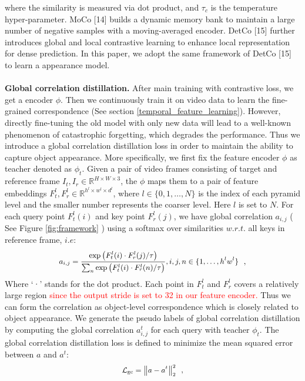\documentclass{article}
\begin{document}
	where the similarity is measured via dot product, and $\tau_c$ is the temperature hyper-parameter. MoCo [14] builds a dynamic memory bank to maintain a large number of negative samples with a moving-averaged encoder. DetCo [15] further introduces global and local contrastive learning to enhance local representation for dense prediction. In this paper, we adopt the same framework of DetCo [15] to learn a appearance model.\\
\\
\textbf{Global correlation distillation.} After main training with contrastive loss, we get a encoder $\phi$. Then we continuously train it on video data to learn the fine-grained correspondence (See section \ref{temporal_feature_learning}). However, directly fine-tuning the old model with only new data will lead to a well-known phenomenon of catastrophic forgetting, which degrades the performance. Thus we introduce a global correlation distillation loss in order to maintain the ability to capture object appearance. More specifically, we first fix the feature encoder $\phi$ as teacher denoted as $\phi_t$. Given a pair of video frames consisting of target and reference frame $I_{t}, I_r \in \mathbb{R}^{H\times W \times 3}$, the  $\phi$ maps them to a pair of feature embeddings $F^l_t,F^l_{r} \in \mathbb{R}^{h^l\times w^l \times d^l}$, where $l \in \{0, 1, \ldots, N \}$ is the index of each pyramid level and the smaller number represents the coarser level. Here $l$ is set to $N$. For each query point $F^l_t(i)$ and key point $F^l_r(j)$, we have global correlation $a_{i, j}$ ( See Figure \ref{fig:framework} ) using a softmax over similarities $w. r. t.$ all keys in reference frame, $i. e$:\\
\begin{equation}\label{eq:global_correlation}
  \small
  \begin{aligned}
    a_{i, j}=\frac{\exp \left(F^l_t(i)  \cdot F^l_r(j) / \tau\right)}{\sum_{n} \exp \left(F^l_t(i) \cdot F^l_r(n) / \tau\right)}, i,j,n \in \{1,\ldots,h^lw^l\}
  \end{aligned}~~,
\end{equation}
Where ‘·’ stands for the dot product. Each point in $F^l_t$ and $F^l_{r}$ covers a relatively large region \textcolor{red}{since the output stride is set to 32 in our feature encoder.} Thus we can form the correlation as object-level correspondence which is closely related to object appearance. We generate the pseudo labels of global correlation distillation by computing the global correlation  $a^t_{i, j}$ for each query with teacher $\phi_t$. The global correlation distillation loss is defined to minimize the mean squared error between $a$ and $a^t$:\\
\begin{equation}\label{eq:global_correlation_loss}
  \small
  \begin{aligned}
    \mathcal{L}_{\mathrm{gc}}  = \left\|a-a^t\right\|_{2}^{2}
  \end{aligned}~~,
\end{equation}
\end{document}
